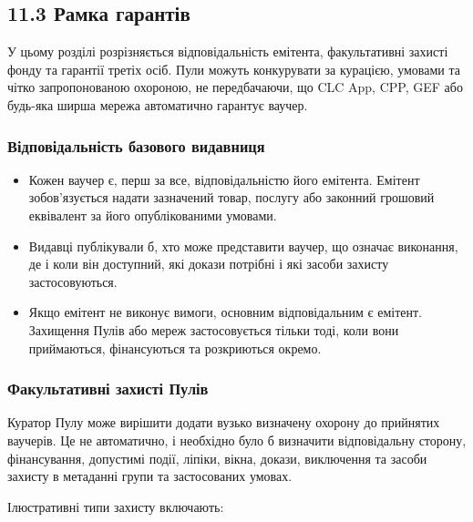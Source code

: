 \documentclass[11pt]{article}
\begin{document}
\subsection*{11.3 Рамка гарантів}

У цьому розділі розрізняється відповідальність емітента, факультативні захисті фонду та гарантії третіх осіб. Пули можуть конкурувати за курацією, умовами та чітко запропонованою охороною, не передбачаючи, що CLC App, CPP, GEF або будь-яка ширша мережа автоматично гарантує ваучер.

\subsubsection*{Відповідальність базового видавниця}

\begin{itemize}[leftmargin=*]
\item Кожен ваучер є, перш за все, відповідальністю його емітента. Емітент зобов'язується надати зазначений товар, послугу або законний грошовий еквівалент за його опублікованими умовами.
\item Видавці публікували б, хто може представити ваучер, що означає виконання, де і коли він доступний, які докази потрібні і які засоби захисту застосовуються.
\item Якщо емітент не виконує вимоги, основним відповідальним є емітент. Захищення Пулів або мереж застосовується тільки тоді, коли вони приймаються, фінансуються та розкриються окремо.
\end{itemize}
\subsubsection*{Факультативні захисті Пулів}

Куратор Пулу може вирішити додати вузько визначену охорону до прийнятих ваучерів. Це не автоматично, і необхідно було б визначити відповідальну сторону, фінансування, допустимі події, ліпіки, вікна, докази, виключення та засоби захисту в метаданні групи та застосованих умовах.

Ілюстративні типи захисту включають:
\end{document}
